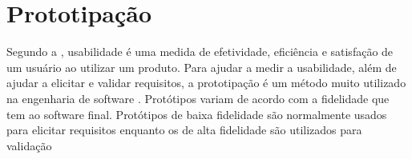 \section{Prototipação}

Segundo a , usabilidade é uma medida de efetividade, eficiência e satisfação de um usuário ao utilizar um produto. Para ajudar a medir a usabilidade, além de ajudar a elicitar e validar requisitos, a prototipação é um método muito utilizado na engenharia de software \cite{sommerville}.
Protótipos variam de acordo com a fidelidade que tem ao software final. Protótipos de baixa fidelidade são normalmente usados para elicitar requisitos enquanto os de alta fidelidade são utilizados para validação \cite{prototipacao}
